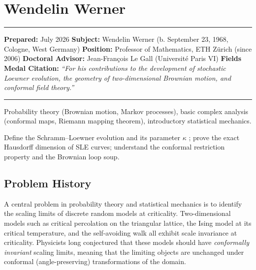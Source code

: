 \chapter{Wendelin Werner}\label{ch2006wendelinwerner:wendelin-werner-fields-medal-2006-a-comprehensive-report-on-his-work-and-impact}

\begin{center}\rule{0.5\linewidth}{0.5pt}\end{center}

\textbf{Prepared:} July 2026 \textbf{Subject:} Wendelin Werner (b. September 23, 1968, Cologne, West Germany) \textbf{Position:} Professor of Mathematics, ETH Zürich (since 2006) \textbf{Doctoral Advisor:} Jean-François Le Gall (Université Paris VI) \textbf{Fields Medal Citation:} \emph{``For his contributions to the development of stochastic Loewner evolution, the geometry of two-dimensional Brownian motion, and conformal field theory.''}

\begin{center}\rule{0.5\linewidth}{0.5pt}\end{center}

\begin{prereqs} Probability theory (Brownian motion, Markov processes), basic complex analysis (conformal maps, Riemann mapping theorem), introductory statistical mechanics. \end{prereqs}

\begin{objectives} Define the Schramm--Loewner evolution and its parameter $\kappa$ \cite{werner2004}; prove the exact Hausdorff dimension of SLE curves; understand the conformal restriction property and the Brownian loop soup. \end{objectives}

\section{Problem History}\label{ch2006wendelinwerner:problem-history}

A central problem in probability theory and statistical mechanics is to identify the scaling limits of discrete random models at criticality. Two-dimensional models such as critical percolation on the triangular lattice, the Ising model at its critical temperature, and the self-avoiding walk all exhibit scale invariance at criticality. Physicists long conjectured that these models should have \emph{conformally invariant} scaling limits, meaning that the limiting objects are unchanged under conformal (angle-preserving) transformations of the domain.

